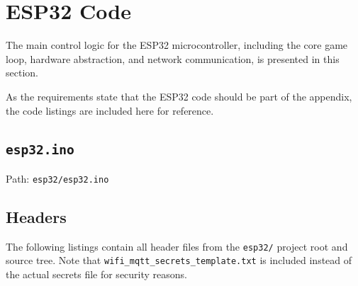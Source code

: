 \section{ESP32 Code}
\label{sec:esp32_code}
The main control logic for the ESP32 microcontroller, including the core game loop,
hardware abstraction, and network communication, is presented in this section.

As the requirements state that the ESP32 code should be part of the appendix,
the code listings are included here for reference.

\subsection{\texttt{esp32.ino}}
Path: \texttt{esp32/esp32.ino}


\subsection{Headers}
The following listings contain all header files from the \texttt{esp32/} project root and source tree.
Note that \texttt{wifi\_mqtt\_secrets\_template.txt} is included instead of the actual secrets file for security reasons.


